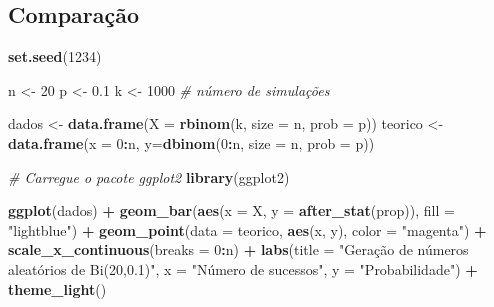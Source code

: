 \documentclass[
]{book}
\newenvironment{Shaded}{\begin{snugshade}}{\end{snugshade}}
\newcommand{\AttributeTok}[1]{\textcolor[rgb]{0.13,0.29,0.53}{#1}}
\newcommand{\CommentTok}[1]{\textcolor[rgb]{0.56,0.35,0.01}{\textit{#1}}}
\newcommand{\DecValTok}[1]{\textcolor[rgb]{0.00,0.00,0.81}{#1}}
\newcommand{\FloatTok}[1]{\textcolor[rgb]{0.00,0.00,0.81}{#1}}
\newcommand{\FunctionTok}[1]{\textcolor[rgb]{0.13,0.29,0.53}{\textbf{#1}}}
\newcommand{\NormalTok}[1]{#1}
\newcommand{\OtherTok}[1]{\textcolor[rgb]{0.56,0.35,0.01}{#1}}
\newcommand{\SpecialCharTok}[1]{\textcolor[rgb]{0.81,0.36,0.00}{\textbf{#1}}}
\newcommand{\StringTok}[1]{\textcolor[rgb]{0.31,0.60,0.02}{#1}}
\begin{document}
\subsection{Comparação}\label{comparauxe7uxe3o}

\begin{Shaded}
\begin{Highlighting}[]
\FunctionTok{set.seed}\NormalTok{(}\DecValTok{1234}\NormalTok{)}

\NormalTok{n }\OtherTok{\textless{}{-}} \DecValTok{20}
\NormalTok{p }\OtherTok{\textless{}{-}} \FloatTok{0.1}
\NormalTok{k }\OtherTok{\textless{}{-}} \DecValTok{1000} \CommentTok{\# número de simulações}

\NormalTok{dados }\OtherTok{\textless{}{-}} \FunctionTok{data.frame}\NormalTok{(}\AttributeTok{X =} \FunctionTok{rbinom}\NormalTok{(k, }\AttributeTok{size =}\NormalTok{ n, }\AttributeTok{prob =}\NormalTok{ p))}
\NormalTok{teorico }\OtherTok{\textless{}{-}} \FunctionTok{data.frame}\NormalTok{(}\AttributeTok{x =} \DecValTok{0}\SpecialCharTok{:}\NormalTok{n, }\AttributeTok{y=}\FunctionTok{dbinom}\NormalTok{(}\DecValTok{0}\SpecialCharTok{:}\NormalTok{n, }\AttributeTok{size =}\NormalTok{ n, }\AttributeTok{prob =}\NormalTok{ p))}

\CommentTok{\# Carregue o pacote ggplot2}
\FunctionTok{library}\NormalTok{(ggplot2)}

\FunctionTok{ggplot}\NormalTok{(dados) }\SpecialCharTok{+}  
  \FunctionTok{geom\_bar}\NormalTok{(}\FunctionTok{aes}\NormalTok{(}\AttributeTok{x =}\NormalTok{ X, }\AttributeTok{y =} \FunctionTok{after\_stat}\NormalTok{(prop)), }\AttributeTok{fill =} \StringTok{"lightblue"}\NormalTok{) }\SpecialCharTok{+} 
  \FunctionTok{geom\_point}\NormalTok{(}\AttributeTok{data =}\NormalTok{ teorico, }\FunctionTok{aes}\NormalTok{(x, y), }\AttributeTok{color =} \StringTok{"magenta"}\NormalTok{) }\SpecialCharTok{+} 
  \FunctionTok{scale\_x\_continuous}\NormalTok{(}\AttributeTok{breaks =} \DecValTok{0}\SpecialCharTok{:}\NormalTok{n) }\SpecialCharTok{+}  
  \FunctionTok{labs}\NormalTok{(}\AttributeTok{title =} \StringTok{"Geração de números aleatórios de Bi(20,0.1)"}\NormalTok{, }\AttributeTok{x =} \StringTok{"Número de sucessos"}\NormalTok{,       }
  \AttributeTok{y =} \StringTok{"Probabilidade"}\NormalTok{) }\SpecialCharTok{+}  
  \FunctionTok{theme\_light}\NormalTok{()}
\end{Highlighting}
\end{Shaded}
\end{document}
